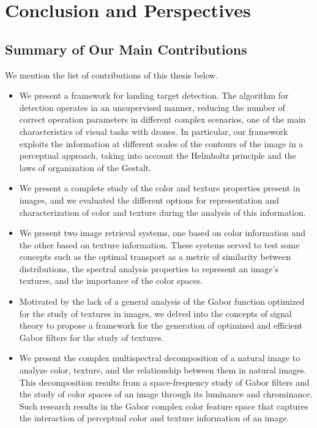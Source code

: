\chapter*{Conclusion and Perspectives}\label{ch:general_conclusion}

\section*{Summary of Our Main Contributions}

We mention the list of contributions of this thesis below.

\begin{itemize}
	\item We present a framework for landing target detection. The algorithm for detection operates in an unsupervised manner, reducing the number of correct operation parameters in different complex scenarios, one of the main characteristics of visual tasks with drones. In particular, our framework exploits the information at different scales of the contours of the image in a perceptual approach, taking into account the Helmholtz principle and the laws of organization of the Gestalt.
	\item We present a complete study of the color and texture properties present in images, and we evaluated the different options for representation and characterization of color and texture during the analysis of this information.
	\item We present two image retrieval systems, one based on color information and the other based on texture information. These systems served to test some concepts such as the optimal transport as a metric of similarity between distributions, the spectral analysis properties to represent an image's textures, and the importance of the color spaces.
	\item Motivated by the lack of a general analysis of the Gabor function optimized for the study of textures in images, we delved into the concepts of signal theory to propose a framework for the generation of optimized and efficient Gabor filters for the study of textures.
	\item We present the complex multispectral decomposition of a natural image to analyze color, texture, and the relationship between them in natural images. This decomposition results from a space-frequency study of Gabor filters and the study of color spaces of an image through its luminance and chrominance. Such research results in the Gabor complex color feature space that captures the interaction of perceptual color and texture information of an image.

\end{itemize}
